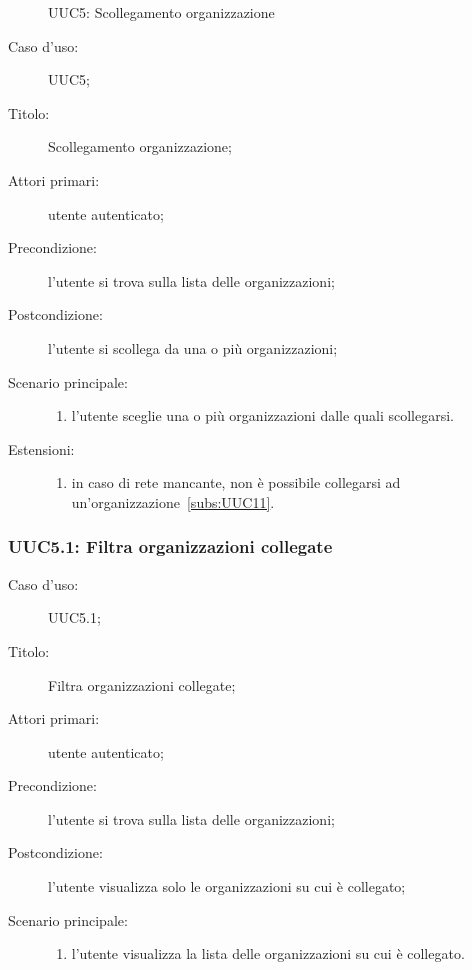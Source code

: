 \documentclass[../../../analisi-dei-requisiti.tex]{subfiles}
\begin{document}
\begin{figure}[H]
  \centering
  \caption{UUC5: Scollegamento organizzazione}%
  \label{fig:UUC11}
\end{figure}

\begin{description}
  \item[Caso d’uso:] UUC5;
  \item[Titolo:] Scollegamento organizzazione;
  \item[Attori primari:] utente autenticato;
  \item[Precondizione:] l'utente si trova sulla lista delle organizzazioni;
  \item[Postcondizione:] l'utente si scollega da una o più organizzazioni;
  \item[Scenario principale:]
        \begin{enumerate}
          \item l'utente sceglie una o più organizzazioni dalle quali scollegarsi.
        \end{enumerate}
  \item[Estensioni:]
        \begin{enumerate}
          \item in caso di rete mancante, non è possibile collegarsi ad un'organizzazione~\ref{subs:UUC11}.
        \end{enumerate}
\end{description}


\subsubsection{UUC5.1: Filtra organizzazioni collegate}%
\begin{description}
  \item[Caso d’uso:] UUC5.1;
  \item[Titolo:] Filtra organizzazioni collegate;
  \item[Attori primari:] utente autenticato;
  \item[Precondizione:] l'utente si trova sulla lista delle organizzazioni;
  \item[Postcondizione:] l'utente visualizza solo le organizzazioni su cui è collegato;
  \item[Scenario principale:]
        \begin{enumerate}
          \item l'utente visualizza la lista delle organizzazioni su cui è collegato.
        \end{enumerate}
\end{description}
\end{document}
